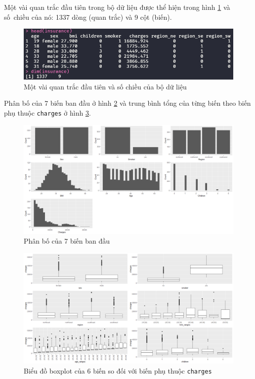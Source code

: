 Một vài quan trắc đầu tiên trong bộ dữ liệu được thể hiện trong hình \ref{fig-a1:head-dataset} và số~chiều của nó: 1337 dòng (quan trắc) và 9 cột (biến).
\begin{figure}[H]
	\centering
	\includegraphics[width=0.9\linewidth]{images/A1/head-dataset}
	\caption{Một vài quan trắc đầu tiên và số chiều của bộ dữ liệu}
	\label{fig-a1:head-dataset}
\end{figure}

Phân bố của 7 biến ban đầu ở hình \ref{fig-a1:plot-vars} và trung bình tổng của từng biến theo biến phụ thuộc \texttt{charges} ở hình \ref{fig-a1:boxplot-vars}.
\begin{figure}[H]
	\centering
	\includegraphics[width=1\linewidth]{images/A1/plot-vars}
	\caption{Phân bố của 7 biến ban đầu}
	\label{fig-a1:plot-vars}
\end{figure}

\begin{figure}[H]
	\centering
	\includegraphics[width=1\linewidth]{images/A1/boxplot-vars-by-charges}
	\caption{Biểu đồ boxplot của 6 biến so đối với biến phụ thuộc \texttt{charges}}
	\label{fig-a1:boxplot-vars}
\end{figure}

